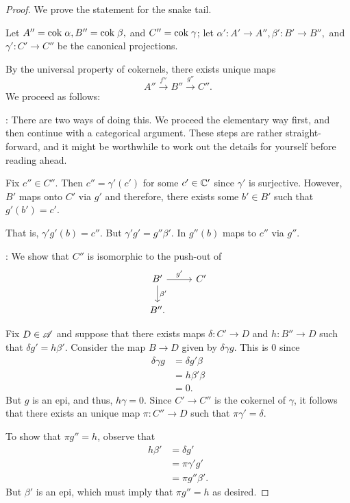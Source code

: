 \begin{proof}
We prove the statement for the snake tail.

Let $A'' = \mathrm{cok}\; \alpha, B'' = \mathrm{cok}\; \beta,$ and $C'' = \mathrm{cok}\; 
\gamma$; let $\alpha': A' \to A'', \beta': B' \to B'',$ and
$\gamma': C' \to C''$ be the canonical projections. 

By the universal property of cokernels, there exists unique
maps
\[
A'' \stackrel{f''}{\to} B'' \stackrel{g''}{\to} C''.
\]
We proceed as follows:

: There are two ways of doing this.
We proceed the elementary way first, and then continue with
a categorical argument. These steps are rather straight-forward, 
and it might be worthwhile to work out the details for yourself 
before reading ahead.

Fix $c'' \in C''$. Then $c'' = \gamma'(c')$ for some $c' \in \mathbb{C}'$
since $\gamma'$ is surjective. However, $B'$ maps onto $C'$ via
$g'$ and therefore, there exists some $b' \in B'$ such that $g'(b')
= c'$.

That is, $\gamma'g'(b) = c''$. But $\gamma'g' = g''\beta'$. In
$g''(b)$ maps to $c''$ via $g''$.

 : We show that $C''$
is isomorphic to the push-out of
\[
\begin{tikzcd}
B' \arrow{r}{g'} \arrow{d}{\beta'} &C' \\
B''.
\end{tikzcd}
\]

Fix $D \in \mathscr{A}$ and suppose that there exists maps $\delta: 
C' \to D$ and $h: B'' \to D$ such that $\delta g' = h\beta'$.
Consider the map $B \to D$ given by $\delta \gamma g$. This is
$0$ since
\begin{align*}
\delta \gamma g &= \delta g' \beta \\
                &= h \beta' \beta \\
                &= 0.
\end{align*}
But $g$ is an epi, and thus, $h \gamma = 0$. Since $C' \to C''$
is the cokernel of $\gamma$, it follows that there exists an 
unique map $\pi: C'' \to D$ such that $\pi \gamma' = \delta.$

To show that $\pi g'' = h$, observe that
\begin{align*}
h \beta' &= \delta g' \\
         &= \pi \gamma' g' \\
         &= \pi g'' \beta'.
\end{align*}
But $\beta'$ is an epi, which must imply that $\pi g'' = h$ as
desired.


\end{proof}
